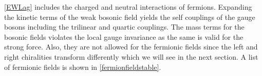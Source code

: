 \autoref{EWLag} includes the charged and neutral interactions of fermions. Expanding the kinetic terms of the weak bosonic field yields the self couplings of the gauge bosons including the trilinear and quartic couplings. The mass terms for the bosonic fields violates the local gauge invariance as the same is valid for the strong force. Also, they are not allowed for the fermionic fields since the left and right chiralities transform differently which we will see in the next section. A list of fermionic fields is shown in \autoref{fermionfieldstable}.

\begin{table}[ht]
	{\setlength{\tabcolsep}{14pt}
		\caption{Fermion fields under $SU(2)_L$ group representation.}
		\begin{center}
			\vspace{-6mm}
\end{center}}
\end{table}
